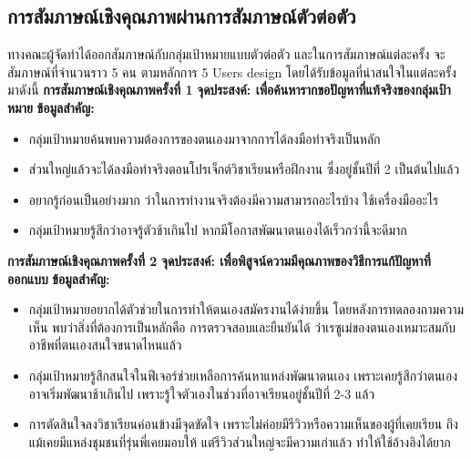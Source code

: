 \subsection{การสัมภาษณ์เชิงคุณภาพผ่านการสัมภาษณ์ตัวต่อตัว}
ทางคณะผู้จัดทำได้ออกสัมภาษณ์กับกลุ่มเป้าหมายแบบตัวต่อตัว และในการสัมภาษณ์แต่ละครั้ง จะสัมภาษณ์ที่จำนวนราว 5 คน ตามหลักการ 5 Users design โดยได้รับข้อมูลที่น่าสนใจในแต่ละครั้งมาดังนี้
\newline
\textbf{การสัมภาษณ์เชิงคุณภาพครั้งที่ 1}
\newline
\textbf{จุดประสงค์: เพื่อค้นหารากขอปัญหาที่แท้จริงของกลุ่มเป้าหมาย}
\newline
\textbf{ข้อมูลสำคัญ: }
\begin{itemize}
    \item กลุ่มเป้าหมายค้นพบความต้องการของตนเองมาจากการได้ลงมือทำจริงเป็นหลัก
    \item ส่วนใหญ่แล้วจะได้ลงมือทำจริงตอนโปรเจ็กต์วิชาเรียนหรือฝึกงาน ซึ่งอยู่ชั้นปีที่ 2 เป็นต้นไปแล้ว
    \item อยากรู้ก่อนเป็นอย่างมาก ว่าในการทำงานจริงต้องมีความสามารถอะไรบ้าง ใช้เครื่องมืออะไร
    \item กลุ่มเป้าหมายรู้สึกว่าอาจรู้ตัวช้าเกินไป หากมีโอกาสพัฒนาตนเองได้เร็วกว่านี้จะดีมาก
\end{itemize}


\noindent\textbf{การสัมภาษณ์เชิงคุณภาพครั้งที่ 2}
\newline
\textbf{จุดประสงค์: เพื่อพิสูจน์ความมีคุณภาพของวิธีการแก้ปัญหาที่ออกแบบ}
\newline
\textbf{ข้อมูลสำคัญ: }
\begin{itemize}
    \item กลุ่มเป้าหมายอยากได้ตัวช่วยในการทำให้ตนเองสมัครงานได้ง่ายขึ้น โดยหลังการทดลองถามความเห็น พบว่าสิ่งที่ต้องการเป็นหลักคือ การตรวจสอบและยืนยันได้ ว่าเรซูเม่ของตนเองเหมาะสมกับอาชีพที่ตนเองสนใจขนาดไหนแล้ว
    \item กลุ่มเป้าหมายรู้สึกสนใจในฟีเจอร์ช่วยเหลือการค้นหาแหล่งพัฒนาตนเอง เพราะเคยรู้สึกว่าตนเองอาจเริ่มพัฒนาช้าเกินไป เพราะรู้ใจตัวเองในช่วงที่อาจเรียนอยู่ชั้นปีที่ 2-3 แล้ว
    \item การตัดสินใจลงวิชาเรียนค่อนข้างมีจุดขัดใจ เพราะไม่ค่อยมีรีวิวหรือความเห็นของผู้ที่เคยเรียน ถึงแม้เคยมีแหล่งชุมชนที่รุ่นพี่เคยมอบให้ แต่รีวิวส่วนใหญ่จะมีความเก่าแล้ว ทำให้ใช้อ้างอิงได้ยาก
\end{itemize}


